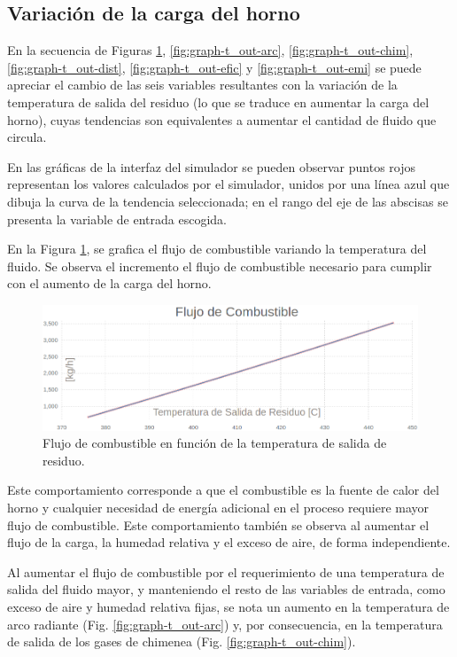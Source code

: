 \subsection{Variación de la carga del horno}
\par En la secuencia de Figuras \ref{fig:graph-t_out-fuel}, \ref{fig:graph-t_out-arc}, \ref{fig:graph-t_out-chim}, \ref{fig:graph-t_out-dist}, \ref{fig:graph-t_out-efic} y \ref{fig:graph-t_out-emi} se puede apreciar el cambio de las seis variables resultantes con la variación de la temperatura de salida del residuo (lo que se traduce en aumentar la carga del horno), cuyas tendencias son equivalentes a aumentar el cantidad de fluido que circula.
\par En las gráficas de la interfaz del simulador se pueden observar puntos rojos representan los valores calculados por el simulador, unidos por una línea azul que dibuja la curva de la tendencia seleccionada; en el rango del eje de las abscisas se presenta la variable de entrada escogida.
\par En la Figura \ref{fig:graph-t_out-fuel}, se grafica el flujo de combustible variando la temperatura del fluido. Se observa el incremento el flujo de combustible necesario para cumplir con el aumento de la carga del horno.
\begin{figure}[H]\begin{center}
\includegraphics[scale=0.46]{images/graph-t_out-fuel}
\caption[Flujo de combustible en función de Temperatura de salida de residuo]{Flujo de combustible en función de la temperatura de salida de residuo.}
\label{fig:graph-t_out-fuel}\end{center}\end{figure}
\par Este comportamiento corresponde a que el combustible es la fuente de calor del horno y cualquier necesidad de energía adicional en el proceso requiere mayor flujo de combustible. Este comportamiento también se observa al aumentar el flujo de la carga, la humedad relativa y el exceso de aire, de forma independiente.
\par Al aumentar el flujo de combustible por el requerimiento de una temperatura de salida del fluido mayor, y manteniendo el resto de las variables de entrada, como exceso de aire y humedad relativa fijas, se nota un aumento en la temperatura de arco radiante (Fig. \ref{fig:graph-t_out-arc}) y, por consecuencia, en la temperatura de salida de los gases de chimenea (Fig. \ref{fig:graph-t_out-chim}).
